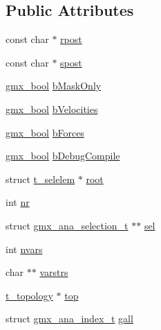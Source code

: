 \subsection*{\-Public \-Attributes}
\begin{DoxyCompactItemize}
\item 
const char $\ast$ \hyperlink{structgmx__ana__selcollection__t_ae4a7c78bd05cc8563ff257981304379d}{rpost}
\item 
const char $\ast$ \hyperlink{structgmx__ana__selcollection__t_a5c1bbb53e09e192a19bf935e19167a47}{spost}
\item 
\hyperlink{include_2types_2simple_8h_a8fddad319f226e856400d190198d5151}{gmx\-\_\-bool} \hyperlink{structgmx__ana__selcollection__t_a93b850e091026d957f521ffc01df5442}{b\-Mask\-Only}
\item 
\hyperlink{include_2types_2simple_8h_a8fddad319f226e856400d190198d5151}{gmx\-\_\-bool} \hyperlink{structgmx__ana__selcollection__t_a5d79f1787409dbc3cd24fadfe3d8f90f}{b\-Velocities}
\item 
\hyperlink{include_2types_2simple_8h_a8fddad319f226e856400d190198d5151}{gmx\-\_\-bool} \hyperlink{structgmx__ana__selcollection__t_aeb63f6c0d45e2384f18f5037f5eca1de}{b\-Forces}
\item 
\hyperlink{include_2types_2simple_8h_a8fddad319f226e856400d190198d5151}{gmx\-\_\-bool} \hyperlink{structgmx__ana__selcollection__t_ae40b954701fd04a678ab7e4303351439}{b\-Debug\-Compile}
\item 
struct \hyperlink{structt__selelem}{t\-\_\-selelem} $\ast$ \hyperlink{structgmx__ana__selcollection__t_a737b4bcd43cfc06f937d384ee0454b3a}{root}
\item 
int \hyperlink{structgmx__ana__selcollection__t_a7841df40deda421c369a1905042c685a}{nr}
\item 
struct \hyperlink{structgmx__ana__selection__t}{gmx\-\_\-ana\-\_\-selection\-\_\-t} $\ast$$\ast$ \hyperlink{structgmx__ana__selcollection__t_aa15772f3b6553257458628de911c2858}{sel}
\item 
int \hyperlink{structgmx__ana__selcollection__t_a37024150813423ca2e30869386357f24}{nvars}
\item 
char $\ast$$\ast$ \hyperlink{structgmx__ana__selcollection__t_ada7faddf234af8bb9f6b76a2d40f1ce0}{varstrs}
\item 
\hyperlink{structt__topology}{t\-\_\-topology} $\ast$ \hyperlink{structgmx__ana__selcollection__t_a9598811b277e94e3a52569c692936514}{top}
\item 
struct \hyperlink{structgmx__ana__index__t}{gmx\-\_\-ana\-\_\-index\-\_\-t} \hyperlink{structgmx__ana__selcollection__t_ab395dd9b3cbd0c938096c73b1aed3dea}{gall}

\end{DoxyCompactItemize}
